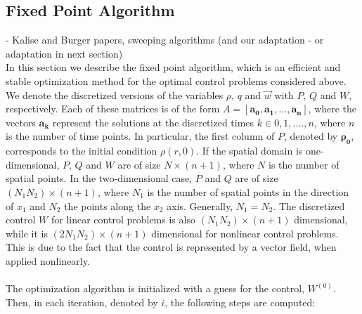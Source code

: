 \documentclass[11pt, a4paper]{article}
\theoremstyle{definition}
\newcommand{\adj}{q}
\begin{document}
\subsection{Fixed Point Algorithm}\label{sec:Method_SolverFP}
- Kalise and Burger papers, sweeping algorithms (and our adaptation - or adaptation in next section)\\

In this section we describe the fixed point algorithm, which is an efficient and stable optimization method for the optimal control problems considered above. 
We denote the discretized versions of the variables $\rho$, $\adj$ and $\vec{w}$ with $P$, $Q$ and $W$, respectively. Each of these matrices is of the form $A = [\boldsymbol{a_0}, \boldsymbol{a_1}, ... ,\boldsymbol{a_n}]$, where the vectors $\boldsymbol{a_k}$ represent the solutions at the discretized times $k \in 0,1,....,n$, where $n$ is the number of time points. In particular, the first column of $P$, denoted by $\boldsymbol{\rho_0}$, corresponds to the initial condition $\rho(r,0)$. If the spatial domain is one-dimensional, $P$, $Q$ and $W$ are of size $N \times (n + 1)$, where $N$ is the number of spatial points. In the two-dimensional case, $P$ and $Q$ are of size $(N_1N_2) \times (n + 1)$, where $N_1$ is the number of spatial points in the direction of $x_1$ and $N_2$ the points along the $x_2$ axis. Generally, $N_1 = N_2$. The discretized control $W$ for linear control problems is also $(N_1N_2) \times (n + 1)$ dimensional, while it is $(2N_1N_2) \times (n + 1)$ dimensional for nonlinear control problems. This is due to the fact that the control is represented by a vector field, when applied nonlinearly.
\\
\\
The optimization algorithm is initialized with a guess for the control, $W^{(0)}$. Then, in each iteration, denoted by $i$, the following steps are computed:
\vspace{0.1cm}
\end{document}
